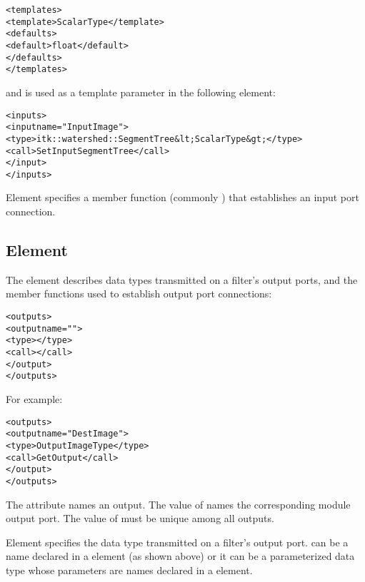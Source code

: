\begin{alltt}
  <templates>
    <template>ScalarType</template>
    <defaults>
      <default>float</default>
    </defaults>
  </templates>
\end{alltt}

and  is used as a template parameter in the
following  element:

\begin{alltt}
  <inputs>
    <input name="InputImage">
      <type>itk::watershed::SegmentTree&lt;ScalarType&gt;</type>
      <call>SetInputSegmentTree</call>
    </input>
  </inputs>
\end{alltt}

Element  specifies a member function (commonly
) that establishes an input port connection.

\subsection{Element }
\label{sec:itk_mods:outputs_element}

The  element describes  data types transmitted
on a filter's output ports, and the member functions used to
establish  output port connections:

\begin{alltt}
  <outputs>
    <output name="">
      <type></type>
      <call></call>
    </output>
    \velide
  </outputs>
\end{alltt}

For example:

\begin{alltt}
  <outputs>
    <output name="DestImage">
      <type>OutputImageType</type>
      <call>GetOutput</call>
    </output>
  </outputs>
\end{alltt}


The  attribute names an output.  The value of
 names the corresponding \sr{} module output port.
The value of  must be unique among all outputs.

Element  specifies the data type transmitted on a
filter's output port.   can be a name
declared in a  element (as shown above) or it
can be a parameterized data type whose parameters are names declared
in a  element.

